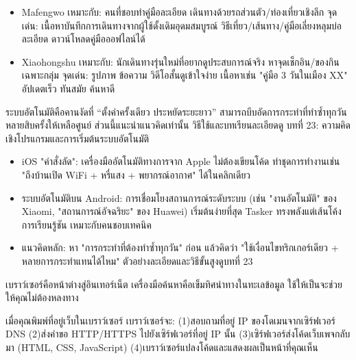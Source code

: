 
\begin{itemize}
  \item Mafengwo เหมาะกับ: คนที่ชอบทำคู่มือละเอียด เดินทางด้วยรถส่วนตัว/ท่องเที่ยวเชิงลึก จุดเด่น: เนื้อหาบันทึกการเดินทางจากผู้ใช้ดั้งเดิมอุดมสมบูรณ์ วิธีเที่ยว/เส้นทาง/คู่มือเลี่ยงหลุมบ่อละเอียด ดาวน์โหลดคู่มือออฟไลน์ได้
  \item Xiaohongshu เหมาะกับ: นักเดินทางรุ่นใหม่ที่อยากดูประสบการณ์จริง หาจุดเช็กอิน/ของกินเฉพาะกลุ่ม จุดเด่น: รูปภาพ ข้อความ วิดีโอสั้นดูเข้าใจง่าย เนื้อหาเช่น "คู่มือ 3 วันในเมือง XX" อัปเดตเร็ว ทันสมัย ค้นหาดี
\end{itemize}


ระบบอัตโนมัติคือคานงัดที่ “ตั้งค่าครั้งเดียว ประหยัดระยะยาว” สามารถบีบอัดการกระทำที่ทำซ้ำทุกวันหลายสิบครั้งให้เหลือศูนย์ ส่วนนี้แนะนำแนวคิดเท่านั้น วิธีใช้และบทเรียนละเอียดดู บทที่ 23: ความคิดเชิงโปรแกรมและการเริ่มต้นระบบอัตโนมัติ

\begin{itemize}
  \item iOS "คำสั่งลัด": เครื่องมืออัตโนมัติทางการจาก Apple ไม่ต้องเขียนโค้ด ทำชุดการทำงานเช่น "ถึงบ้านเปิด WiFi + หรี่แสง + พยากรณ์อากาศ" ได้ในคลิกเดียว
  \item ระบบอัตโนมัติบน Android: การเชื่อมโยงสถานการณ์ระดับระบบ (เช่น "งานอัตโนมัติ" ของ Xiaomi, "สถานการณ์อัจฉริยะ" ของ Huawei) เริ่มต้นง่ายที่สุด Tasker ทรงพลังแต่เส้นโค้งการเรียนรู้ชัน เหมาะกับคนชอบเทคนิค
  \item แนวคิดหลัก: หา "การกระทำที่ต้องทำซ้ำทุกวัน" ก่อน แล้วคิดว่า "ใช้เงื่อนไขทริกเกอร์เดียว + หลายการกระทำแทนได้ไหม" ตัวอย่างละเอียดและวิธีขั้นสูงดูบทที่ 23
\end{itemize}


เบราว์เซอร์คือหน้าต่างสู่อินเทอร์เน็ต เครื่องมือค้นหาคือเข็มทิศนำทางในทะเลข้อมูล ใช้ให้เป็นจะช่วยให้คุณไม่ต้องหลงทาง


เมื่อคุณพิมพ์ที่อยู่เว็บในเบราว์เซอร์ เบราว์เซอร์จะ: (1)สอบถามที่อยู่ IP ของโดเมนจากเซิร์ฟเวอร์ DNS (2)ส่งคำขอ HTTP/HTTPS ไปยังเซิร์ฟเวอร์ที่อยู่ IP นั้น (3)เซิร์ฟเวอร์ส่งโค้ดเว็บเพจกลับมา (HTML, CSS, JavaScript) (4)เบราว์เซอร์แปลงโค้ดและแสดงผลเป็นหน้าที่คุณเห็น


